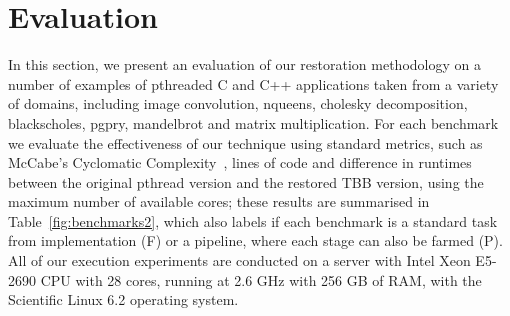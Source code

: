 %
%
%
%
%

\section{Evaluation}
\label{sec:evaluation}

In this section, we present an evaluation of our restoration methodology on a number of examples of pthreaded C and C++ applications taken from a variety of domains, including image convolution, nqueens, cholesky decomposition, blackscholes, pgpry, mandelbrot and matrix multiplication. For each benchmark we evaluate the effectiveness of our technique using standard metrics, such as McCabe's Cyclomatic Complexity~\cite{10.1109/TSE.1976.233837}, lines of code and difference in runtimes between the original pthread version and the restored TBB version, using the maximum number of available cores; these results are summarised in Table~\ref{fig:benchmarks2}, which also labels if each benchmark is a standard task from implementation (F) or a pipeline, where each stage can also be farmed (P). All of our execution experiments are conducted on a server with Intel Xeon E5-2690 CPU with 28 cores, running at 2.6 GHz with 256 GB of RAM, with the Scientific Linux 6.2 operating system.

